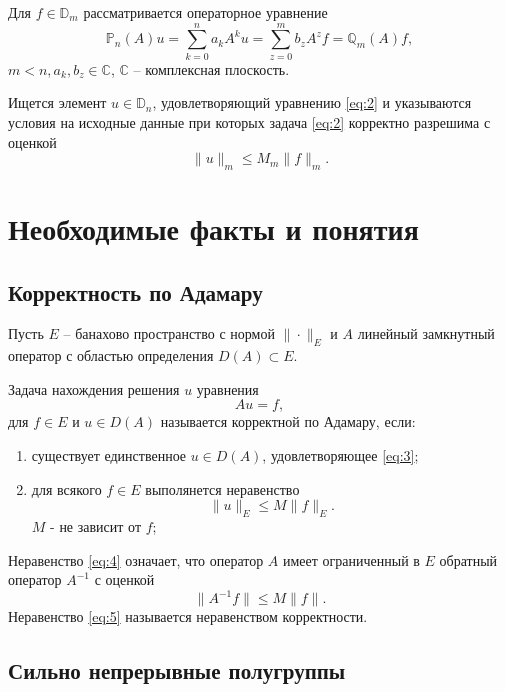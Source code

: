 \documentclass[1244sdpt,a4paper]{article}
\theoremstyle{plain}
\numberwithin{equation}{section}
\begin{document}
Для $f \in \mathbb{D}_m$ рассматривается операторное уравнение
\begin{equation}
    \label{eq:2}
    \mathbb{P}_n(A)u = \sum_{k=0}^{n}a_k A^k u = \sum_{z=0}^{m} b_z A^z f = \mathbb{Q}_m(A)f,
\end{equation}
$m < n, a_k, b_z \in \mathbb{C}$, $\mathbb{C}$ -- комплексная плоскость.

Ищется элемент $u \in \mathbb{D}_n$, удовлетворяющий уравнению \ref{eq:2} и указываются условия
на исходные данные при которых задача \ref{eq:2} корректно разрешима с оценкой
\begin{equation}
    \|u\|_m \le M_m \|f\|_m.
\end{equation}

\section{Необходимые факты и понятия}

\subsection{Корректность по Адамару}

Пусть $E$ -- банахово пространство с нормой $\|\cdot\|_E$ и $A$ линейный замкнутный оператор с областью
определения $D(A) \subset E$.

Задача нахождения решения $u$ уравнения
\begin{equation}
    \label{eq:3}
    Au = f,
\end{equation}
для $f \in E$ и $u \in D(A)$ называется корректной по Адамару, если:
\begin{enumerate}
    \item существует единственное $u \in D(A)$, удовлетворяющее \ref{eq:3};
    \item для всякого $f \in E$ выполянется неравенство
    \begin{equation}
        \label{eq:4}
        \|u\|_E \le M \|f\|_E.
    \end{equation}
    $M$ - не зависит от $f$;
\end{enumerate}
Неравенство \ref{eq:4} означает, что оператор $A$ имеет ограниченный в $E$ обратный оператор $A^{-1}$ с оценкой
\begin{equation}
    \label{eq:5}
    \|A^{-1}f\| \le M \|f\|.
\end{equation}
Неравенство \ref{eq:5} называется неравенством корректности.

\subsection{Сильно непрерывные полугруппы}
\end{document}
